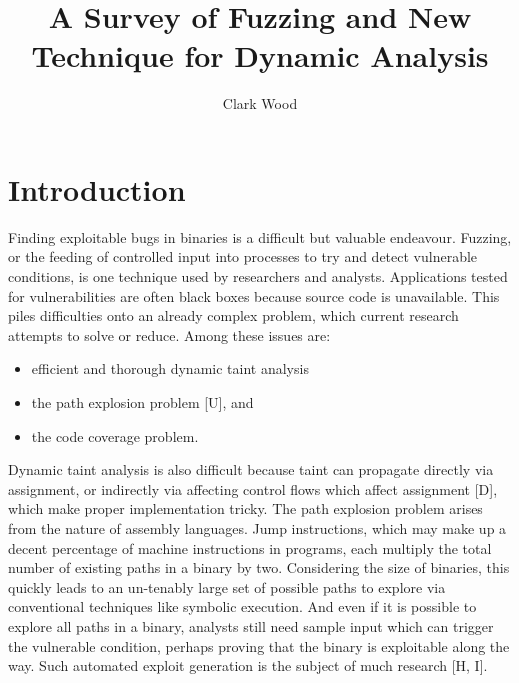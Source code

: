 \documentclass[11pt,expanded,copyright]{fsuthesis}
\title{A Survey of Fuzzing and New Technique for Dynamic Analysis}
\author{Clark Wood}
\begin{document}
\frontmatter
\maketitle
\makecommitteepage



\tableofcontents




\mainmatter

%

\chapter{Introduction}

Finding exploitable bugs in binaries is a difficult but valuable endeavour. Fuzzing, or the feeding of controlled input into processes to try and detect vulnerable conditions, is one technique used by researchers and analysts. Applications tested for vulnerabilities are often black boxes because source code is unavailable. This piles difficulties onto an already complex problem, which current research attempts to solve or reduce. Among these issues are:
	\begin{itemize}
		\item efficient and thorough dynamic taint analysis
		\item the path explosion problem [U], and
		\item the code coverage problem. 
	\end{itemize}

 
 Dynamic taint analysis is also difficult because taint can propagate directly via assignment, or indirectly via affecting control flows which affect assignment [D], which make proper implementation tricky. The path explosion problem arises from the nature of assembly languages. Jump instructions, which may make up a decent percentage of machine instructions in programs, each multiply the total number of existing paths in a binary by two. Considering the size of binaries, this quickly leads to an un-tenably large set of possible paths to explore via conventional techniques like symbolic execution. And even if it is possible to explore all paths in a binary, analysts still need sample input which can trigger the vulnerable condition, perhaps proving that the binary is exploitable along the way. Such automated exploit generation is the subject of much research [H, I].
\end{document}
